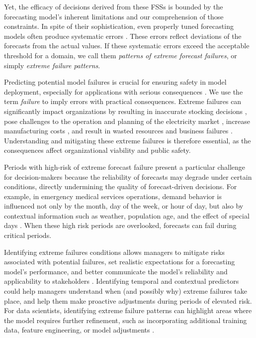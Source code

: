 \documentclass[12pt]{article}
\begin{document}
Yet, the efficacy of decisions derived from these FSSs is bounded by the forecasting model’s inherent limitations and our comprehension of those constraints. In spite of their sophistication, even properly tuned forecasting models often produce systematic errors \citep{eyuboglu2022}. These errors reflect deviations of the forecasts from the actual values. If these systematic errors exceed the acceptable threshold for a domain, we call them \emph{patterns of extreme forecast failures}, or simply %
\emph{extreme failure patterns}.

Predicting potential model failures is crucial for ensuring safety in model deployment, especially for applications with serious consequences \citep{tsiligkaridis2021}. We use the term \emph{failure} to imply errors with practical consequences. Extreme failures can significantly impact organizations by resulting in inaccurate stocking decisions \citep{boylan2021}, pose challenges to the operation and planning of the electricity market \citep{zhu2025}, increase manufacturing costs \citep{sanders2009}, and result in wasted resources and business failures \citep{chae2024}. Understanding and mitigating these extreme failures is therefore essential, as the consequences affect %
organizational viability and public safety.

Periods with high-risk of extreme forecast failure present a particular challenge for decision-makers because the reliability of forecasts may degrade under certain conditions, directly undermining the quality of forecast-driven decisions. For example, in emergency medical services operations, demand behavior is influenced not only by the month, day of the week, or hour of  day, but also by contextual information such as weather, population age, and the effect of special days \citep{abreu2023}. When these high risk periods are overlooked, forecasts can fail during critical periods.

Identifying extreme failures conditions allows managers to mitigate risks associated with potential failures, set realistic expectations for a forecasting model's performance, and better communicate the model's reliability and applicability to stakeholders \citep{cakmak2024}. Identifying temporal and contextual predictors could help managers understand when (and possibly why) extreme failures take place, and help them make proactive adjustments during periods of elevated risk. For data scientists, identifying extreme failure patterns can highlight areas where the model requires further refinement, such as incorporating additional training data, feature engineering, or model adjustments \citep{cakmak2024}. 
\end{document}
